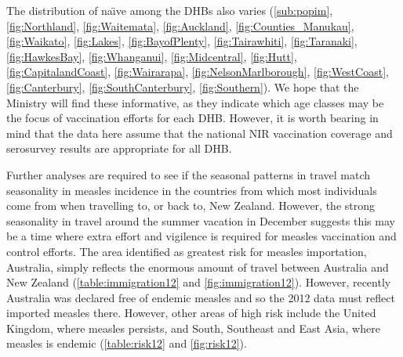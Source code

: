 \documentclass{article}
\begin{document}
The distribution of na\"{\i}ve among the DHBs also varies (\autoref{sub:popim}, \autoref{fig:Northland}, \autoref{fig:Waitemata}, \autoref{fig:Auckland}, \autoref{fig:Counties_Manukau}, \autoref{fig:Waikato}, \autoref{fig:Lakes}, \autoref{fig:BayofPlenty}, \autoref{fig:Tairawhiti}, \autoref{fig:Taranaki}, \autoref{fig:HawkesBay}, \autoref{fig:Whanganui}, \autoref{fig:Midcentral}, \autoref{fig:Hutt}, \autoref{fig:CapitalandCoast}, \autoref{fig:Wairarapa}, \autoref{fig:NelsonMarlborough}, \autoref{fig:WestCoast}, \autoref{fig:Canterbury}, \autoref{fig:SouthCanterbury}, \autoref{fig:Southern}).  We hope that the Ministry will find these informative, as they indicate which age classes may be the focus of vaccination efforts for each DHB. However, it is worth bearing in mind that the data here assume that the national NIR vaccination coverage and serosurvey results are appropriate for all DHB.

Further analyses are required to see if the seasonal patterns in travel match seasonality in measles incidence in the countries from which most individuals come from when travelling to, or back to, New Zealand. However, the strong seasonality in travel around the summer vacation in December suggests this may be a time where extra effort and vigilence is required for measles vaccination and control efforts. The area identified as greatest risk for measles importation, Australia, simply reflects the enormous amount of travel between Australia and New Zealand (\autoref{table:immigration12} and \autoref{fig:immigration12}). However, recently Australia was declared free of endemic measles and so the 2012 data must reflect imported measles there. However, other areas of high risk include the United Kingdom, where measles persists, and South, Southeast and East Asia, where measles is endemic (\autoref{table:risk12} and \autoref{fig:risk12}).
\end{document}
